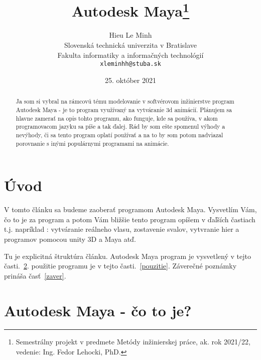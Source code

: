 \documentclass[10pt,twoside,slovak,a4paper]{article}
\title{Autodesk Maya\thanks{Semestrálny projekt v predmete Metódy inžinierskej práce, ak. rok 2021/22, vedenie: Ing. Fedor Lehocki, PhD.}} %
\author{Hieu Le Minh\\[2pt]
	{\small Slovenská technická univerzita v Bratislave}\\
	{\small Fakulta informatiky a informačných technológií}\\
	{\small \texttt{xleminhh@stuba.sk}}
	}
\date{\small 25. október 2021} %
\begin{document}
\maketitle

\begin{abstract}
Ja som si vybral na rámcovú tému modelovanie v softvérovom inžinierstve program Autodesk Maya
- je to program využívaný na vytváranie 3d animácií. 
Plánujem sa hlavne zamerať na opis tohto programu, ako funguje, kde sa používa, v akom 
programovacom jazyku sa píše a tak ďalej. Rád by som ešte spomenul výhody a nevýhody, či 
sa tento program oplatí používať a na to by som potom nadviazal porovnanie s inými populárnymi programami
na animácie.
\end{abstract}



\section{Úvod}

V tomto článku sa budeme zaoberať programom Autodesk Maya. Vysvetlím Vám, čo to je za program a potom Vám bližšie tento program opíšem v ďaľších častiach
t.j. napríklad : vytváranie reálneho vlasu, zostavenie svalov, vytvranie hier a programov pomocou unity 3D a Maya atď.

Tu je explicitná štruktúra článku.
Autodesk Maya program je vysvetlený v tejto časti.~\ref{AM}.
použitie programu je v tejto časti.~\ref{pouzitie}.
Záverečné poznámky prináša časť~\ref{zaver}.



\section{Autodesk Maya - čo to je?} \label{AM}

\end{document}
